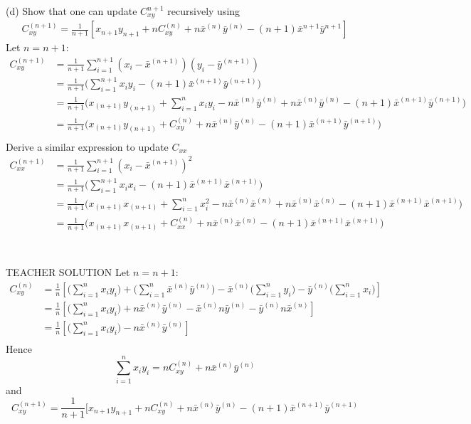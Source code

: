 \documentclass[draft]{exam} %
\theoremstyle{definition} \newtheorem*{defn}{Definition}
\begin{document}
\begin{questions}
\begin{solution}
(d) Show that one can update $C_{xy}^{n+1}$ recursively using
\begin{align*}
C_{xy}^{(n+1)} = \frac{1}{n+1}[x_{n+1}y_{n+1} + nC_{xy}^{(n)} + n\bar{x}^{(n)}\bar{y}^{(n)} - (n+1)\bar{x}^{n+1}\bar{y}^{n+1}]
\end{align*}
Let $n = n+1$:
\begin{align*}
C_{xy}^{(n+1)} & = \frac{1}{n+1} \sum_{i=1}^{n+1} (x_i-\bar{x}^{(n+1)})(y_i - \bar{y}^{(n+1)}) \\
& = \frac{1}{n+1} \Big( \sum_{i=1}^{n+1} x_i y_i - (n+1) \bar{x}^{(n+1)} \bar{y}^{(n+1)} \Big) \\
& = \frac{1}{n+1} \Big( x_{(n+1)} y_{(n+1)} + \sum_{i=1}^{n} x_i y_i - n\bar{x}^{(n)}\bar{y}^{(n)} + n\bar{x}^{(n)}\bar{y}^{(n)} - (n+1)\bar{x}^{(n+1)}\bar{y}^{(n+1)} \Big)\\
& = \frac{1}{n+1} \Big( x_{(n+1)} y_{(n+1)} + C_{xy}^{(n)} + n\bar{x}^{(n)}\bar{y}^{(n)} - (n+1)\bar{x}^{(n+1)}\bar{y}^{(n+1)} \Big)\\
\end{align*}
Derive a similar expression to update $C_{xx}$
\begin{align*}
C_{xx}^{(n+1)} & = \frac{1}{n+1} \sum_{i=1}^{n+1} (x_i-\bar{x}^{(n+1)})^2 \\
& = \frac{1}{n+1} \Big( \sum_{i=1}^{n+1} x_i x_i - (n+1) \bar{x}^{(n+1)}\bar{x}^{(n+1)} \Big) \\
& = \frac{1}{n+1} \Big( x_{(n+1)} x_{(n+1)} + \sum_{i=1}^{n} x_i^2 - n\bar{x}^{(n)}\bar{x}^{(n)} + n\bar{x}^{(n)}\bar{x}^{(n)} - (n+1)\bar{x}^{(n+1)}\bar{x}^{(n+1)} \Big)\\
& = \frac{1}{n+1} \Big( x_{(n+1)} x_{(n+1)} + C_{xx}^{(n)} + n\bar{x}^{(n)}\bar{x}^{(n)} - (n+1)\bar{x}^{(n+1)}\bar{x}^{(n+1)} \Big)\\
\end{align*}
\\\\
TEACHER SOLUTION
Let $n = n+1$:
\begin{align*}
C_{xy}^{(n)} & = \frac{1}{n} \left[ \big(\sum_{i=1}^{n}x_iy_i\big) +
\big(\sum_{i=1}^{n}\bar{x}^{(n)}\bar{y}^{(n)} \big) - 
\bar{x}^{(n)}\big(\sum_{i=1}^{n}y_i \big) -
\bar{y}^{(n)}\big(\sum_{i=1}^{n}x_i \big) \right] \\
& = \frac{1}{n} \left[ \big(\sum_{i=1}^{n}x_iy_i\big) +
n\bar{x}^{(n)}\bar{y}^{(n)} - 
\bar{x}^{(n)}n \bar{y}^{(n)} -
\bar{y}^{(n)}n \bar{x}^{(n)} \right]\\
& = \frac{1}{n} \left[ \big(\sum_{i=1}^{n}x_iy_i\big) -
n\bar{x}^{(n)}\bar{y}^{(n)} \right]\\
\end{align*}
Hence 
\[ \sum_{i=1}^{n} x_i y_i = nC_{xy}^{(n)} + n\bar{x}^{(n)} \bar{y}^{(n)} \]
and 
\[ C_{xy}^{(n+1)} = \frac{1}{n+1} \big[ x_{n+1}y_{n+1} + n C^{(n)}_{xy} +
n\bar{x}^{(n)} \bar{y}^{(n)} - (n+1) \bar{x}^{(n+1)}\bar{y}^{(n+1)} \]
\end{solution}


\end{questions}
\end{document}
